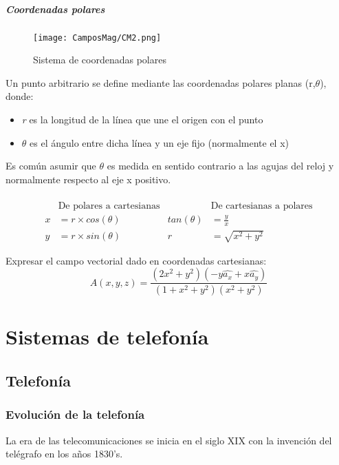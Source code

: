 \documentclass[11pt,fleqn]{book} %
\begin{document}
\subsubsection{Coordenadas polares}
\begin{wrapfigure}{r}{0.4\linewidth}
\centering\texttt{[image: CamposMag/CM2.png]}
\caption{Sistema de coordenadas polares}
\label{fig:coordenadas polares}
\end{wrapfigure}
Un punto arbitrario se define mediante las coordenadas polares planas (r,$\theta$), donde:
\begin{itemize}
\item \textit{r} es la longitud de la línea que une el origen con el punto
\item \textit{$\theta$} es el ángulo entre dicha línea y un eje fijo (normalmente el x)
\end{itemize}
Es común asumir que $\theta$ es medida en sentido contrario a las agujas del reloj y normalmente respecto al eje x positivo.\\
\\
\begin{align*}
&\text{De polares a cartesianas}   &&  \text{De cartesianas a polares}  \\
    x&=r\times cos(\theta)   &  tan(\theta)&=\frac{y}{x} \\
    y&=r\times sin(\theta) & r&=\sqrt{x^2+y^2}
\end{align*}
\begin{example}
Expresar el campo vectorial dado en coordenadas cartesianas:
\begin{displaymath}
A(x,y,z)=\frac{(2x^2+y^2)(-y\hat{a_x}+x\hat{a_y})}{(1+x^2+y^2)(x^2+y^2)}
\end{displaymath}

\end{example}

\part{Sistemas de telefonía}

\chapter{Telefonía}
\section{Evolución de la telefonía}
La era de las telecomunicaciones se inicia en el siglo XIX con la invención del telégrafo en los años 1830’s.
\end{document}
